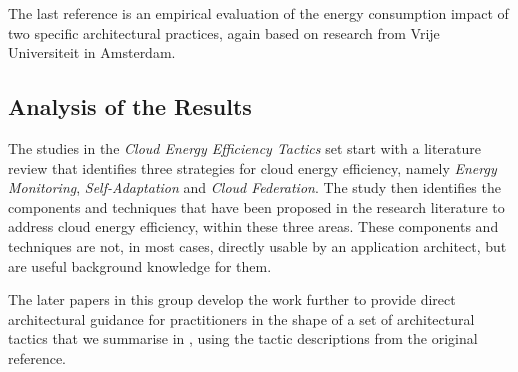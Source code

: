 The last reference \cite{procaccianti2016-twobestpractices} is an empirical evaluation of the energy consumption impact of two specific architectural practices, again based on research from Vrije Universiteit in Amsterdam.

\subsection{Analysis of the Results}

The studies in the \emph{Cloud Energy Efficiency Tactics} set start with a literature review \cite{procaccianti2013-cloudenergyefficiency} that identifies three strategies for cloud energy efficiency, namely \emph{Energy Monitoring}, \emph{Self-Adaptation} and \emph{Cloud Federation}.  The study then identifies the components and techniques that have been proposed in the research literature to address cloud energy efficiency, within these three areas.  These components and techniques are not, in most cases, directly usable by an application architect, but are useful background knowledge for them.

The later papers in this group develop the work further to provide direct architectural guidance for practitioners in the shape of a set of architectural tactics that we summarise in , using the tactic descriptions from the original reference.

